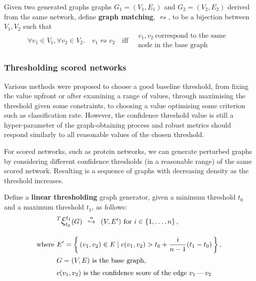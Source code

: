 \begin{definition}
    \label{def:graph_matching}
    Given two generated graphs graphs $G_1 = (V_1, E_1)$ and $G_2 = (V_2, E_2)$ derived from the same network, define \textbf{graph matching}, $\leftrightsquigarrow$, to be a bijection between $V_1, V_2$ such that
    \begin{equation}
        \forall v_1 \in V_1, \forall v_2 \in V_2.\quad v_1 \leftrightsquigarrow v_2\quad\text{iff}\quad \begin{array}{l}
                                                                                                            v_1, v_2\ \text{correspond to the same }\\\text{node in the base graph}
        \end{array}
    \end{equation}
\end{definition}

\subsubsection{Thresholding scored networks}

Various methods were proposed to choose a good baseline threshold, from fixing the value upfront\cite{MeunierAgerelatedChangesModular2009} or after examining a range of values\cite{vanWijkComparingBrainNetworks2010,HorstmannStateDependentProperties2010}, through maximising the threshold given some constraints\cite{BassettAdaptiveReconfigurationFractal2006}, to choosing a value optimising some criterion such as classification rate\cite{ZaninOptimizingFunctionalNetwork2012}.
However, the confidence threshold value is still a hyper-parameter of the graph-obtaining process and robust metrics should respond similarly to all reasonable values of the chosen threshold.

For scored networks, such as protein networks, we can generate perturbed graphs by considering different confidence thresholds (in a reasonable range) of the same scored network.
Resulting is a sequence of graphs with decreasing density as the threshold increases.

Define a \textbf{linear thresholding} graph generator, given a minimum threshold $t_0$ and a maximum threshold $t_1$, as follows:
\begin{align}
    &\mathlarger{^T \mathlarger{\xi}}_{t_0}^{t_1}(G) \generates{n} (V, E')~\text{for}~i\in \integersto{n}, \\[10pt]
    \text{where}~&E' = \Set{(v_1, v_2)\in E}{ c(v_1, v_2) > t_0 + \frac{i}{n - 1}(t_1 - t_0) }, \nonumber \\
    &G = (V, E)~\text{is the base graph}, \nonumber \\
    &c(v_1, v_2)~\text{is the confidence score of the edge $v_1\,\text{---}\,v_2$} \nonumber
\end{align}

